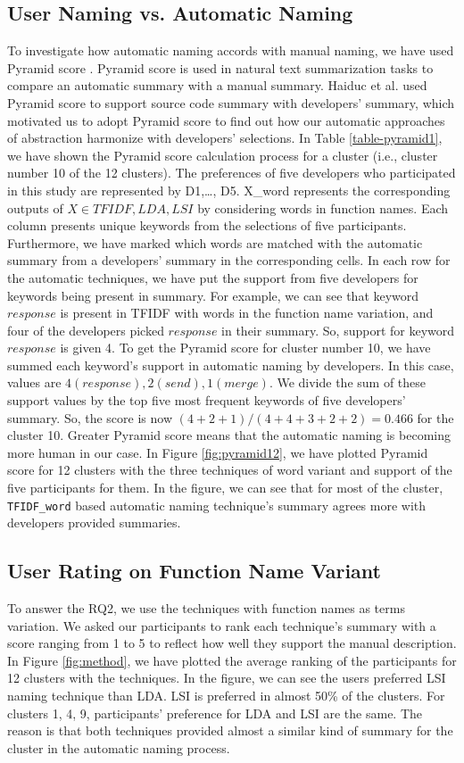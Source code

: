 \subsection{User Naming vs. Automatic Naming}
To investigate how automatic naming accords with manual naming, we have used Pyramid score \cite{nenkova2004evaluating}. Pyramid score is used in natural text summarization tasks to compare an automatic summary with a manual summary. Haiduc et al. \cite{haiduc2010supporting}  used Pyramid score to support source code summary with developers' summary, which motivated us to adopt Pyramid score to find out how our automatic approaches of abstraction harmonize with developers' selections. In Table \ref{table-pyramid1}, we have shown the Pyramid score calculation process for a cluster (i.e., cluster number 10 of the 12 clusters). The preferences of five developers who participated in this study are represented by D1,\ldots, D5. X\_word represents the corresponding outputs of $X \in {TFIDF, LDA, LSI }$ by considering words in function names. Each column presents unique keywords from the selections of five participants. Furthermore, we have marked which words are matched with the automatic summary from a developers' summary in the corresponding cells. In each row for the automatic techniques, we have put the support from five developers for keywords being present in summary. For example, we can see that keyword $response$ is present in TFIDF with words in the function name variation, and four of the developers picked $response$ in their summary. So, support for keyword $response$ is given 4. To get the Pyramid score for cluster number 10, we have summed each keyword's support in automatic naming by developers. In this case, values are $4(response), 2(send), 1(merge)$. We divide the sum of these support values by the top five most frequent keywords of five developers' summary. So, the score is now $(4+2+1)/(4+4+3+2+2) = 0.466 $ for the cluster 10. Greater Pyramid score means that the automatic naming is becoming more human in our case. In Figure \ref{fig:pyramid12}, we have plotted Pyramid score for 12 clusters with the three techniques of word variant and support of the five participants for them. In the figure, we can see that for most of the cluster, \texttt{TFIDF\_word} based automatic naming technique's summary agrees more with developers provided summaries.
\subsection{User Rating on Function Name Variant}
To answer the RQ2, we use the techniques with function names as terms variation. We asked our participants to rank each technique's summary with a score ranging from 1 to 5 to reflect how well they support the manual description. In Figure \ref{fig:method}, we have plotted the average ranking of the participants for 12 clusters with the techniques. In the figure, we can see the users preferred LSI naming technique than LDA. LSI is preferred in almost 50\% of the clusters. For clusters 1, 4, 9, participants' preference for LDA and LSI are the same. The reason is that both techniques provided almost a similar kind of summary for the cluster in the automatic naming process.
